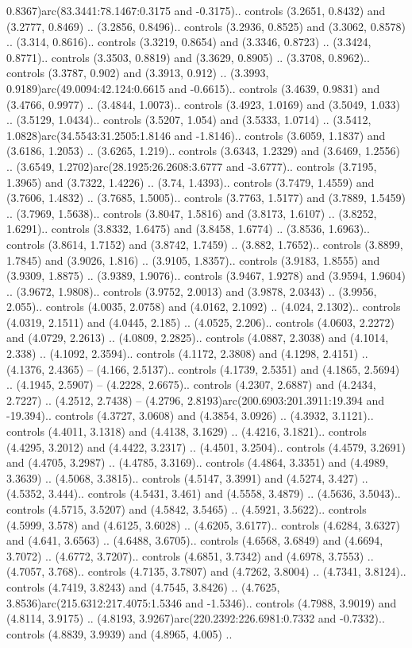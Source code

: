 \begin{scope}[draw=black,line width=0.0422cm,miter limit=10.0]
0.8367)arc(83.3441:78.1467:0.3175 and -0.3175).. controls (3.2651, 0.8432) and (3.2777, 0.8469) .. (3.2856, 0.8496).. controls (3.2936, 0.8525) and (3.3062, 0.8578) .. (3.314, 0.8616).. controls (3.3219, 0.8654) and (3.3346, 0.8723) .. (3.3424, 0.8771).. controls (3.3503, 0.8819) and (3.3629, 0.8905) .. (3.3708, 0.8962).. controls (3.3787, 0.902) and (3.3913, 0.912) .. (3.3993, 0.9189)arc(49.0094:42.124:0.6615 and -0.6615).. controls (3.4639, 0.9831) and (3.4766, 0.9977) .. (3.4844, 1.0073).. controls (3.4923, 1.0169) and (3.5049, 1.033) .. (3.5129, 1.0434).. controls (3.5207, 1.054) and (3.5333, 1.0714) .. (3.5412, 1.0828)arc(34.5543:31.2505:1.8146 and -1.8146).. controls (3.6059, 1.1837) and (3.6186, 1.2053) .. (3.6265, 1.219).. controls (3.6343, 1.2329) and (3.6469, 1.2556) .. (3.6549, 1.2702)arc(28.1925:26.2608:3.6777 and -3.6777).. controls (3.7195, 1.3965) and (3.7322, 1.4226) .. (3.74, 1.4393).. controls (3.7479, 1.4559) and (3.7606, 1.4832) .. (3.7685, 1.5005).. controls (3.7763, 1.5177) and (3.7889, 1.5459) .. (3.7969, 1.5638).. controls (3.8047, 1.5816) and (3.8173, 1.6107) .. (3.8252, 1.6291).. controls (3.8332, 1.6475) and (3.8458, 1.6774) .. (3.8536, 1.6963).. controls (3.8614, 1.7152) and (3.8742, 1.7459) .. (3.882, 1.7652).. controls (3.8899, 1.7845) and (3.9026, 1.816) .. (3.9105, 1.8357).. controls (3.9183, 1.8555) and (3.9309, 1.8875) .. (3.9389, 1.9076).. controls (3.9467, 1.9278) and (3.9594, 1.9604) .. (3.9672, 1.9808).. controls (3.9752, 2.0013) and (3.9878, 2.0343) .. (3.9956, 2.055).. controls (4.0035, 2.0758) and (4.0162, 2.1092) .. (4.024, 2.1302).. controls (4.0319, 2.1511) and (4.0445, 2.185) .. (4.0525, 2.206).. controls (4.0603, 2.2272) and (4.0729, 2.2613) .. (4.0809, 2.2825).. controls (4.0887, 2.3038) and (4.1014, 2.338) .. (4.1092, 2.3594).. controls (4.1172, 2.3808) and (4.1298, 2.4151) .. (4.1376, 2.4365) -- (4.166, 2.5137).. controls (4.1739, 2.5351) and (4.1865, 2.5694) .. (4.1945, 2.5907) -- (4.2228, 2.6675).. controls (4.2307, 2.6887) and (4.2434, 2.7227) .. (4.2512, 2.7438) -- (4.2796, 2.8193)arc(200.6903:201.3911:19.394 and -19.394).. controls (4.3727, 3.0608) and (4.3854, 3.0926) .. (4.3932, 3.1121).. controls (4.4011, 3.1318) and (4.4138, 3.1629) .. (4.4216, 3.1821).. controls (4.4295, 3.2012) and (4.4422, 3.2317) .. (4.4501, 3.2504).. controls (4.4579, 3.2691) and (4.4705, 3.2987) .. (4.4785, 3.3169).. controls (4.4864, 3.3351) and (4.4989, 3.3639) .. (4.5068, 3.3815).. controls (4.5147, 3.3991) and (4.5274, 3.427) .. (4.5352, 3.444).. controls (4.5431, 3.461) and (4.5558, 3.4879) .. (4.5636, 3.5043).. controls (4.5715, 3.5207) and (4.5842, 3.5465) .. (4.5921, 3.5622).. controls (4.5999, 3.578) and (4.6125, 3.6028) .. (4.6205, 3.6177).. controls (4.6284, 3.6327) and (4.641, 3.6563) .. (4.6488, 3.6705).. controls (4.6568, 3.6849) and (4.6694, 3.7072) .. (4.6772, 3.7207).. controls (4.6851, 3.7342) and (4.6978, 3.7553) .. (4.7057, 3.768).. controls (4.7135, 3.7807) and (4.7262, 3.8004) .. (4.7341, 3.8124).. controls (4.7419, 3.8243) and (4.7545, 3.8426) .. (4.7625, 3.8536)arc(215.6312:217.4075:1.5346 and -1.5346).. controls (4.7988, 3.9019) and (4.8114, 3.9175) .. (4.8193, 3.9267)arc(220.2392:226.6981:0.7332 and -0.7332).. controls (4.8839, 3.9939) and (4.8965, 4.005) .. 
\end{scope}
